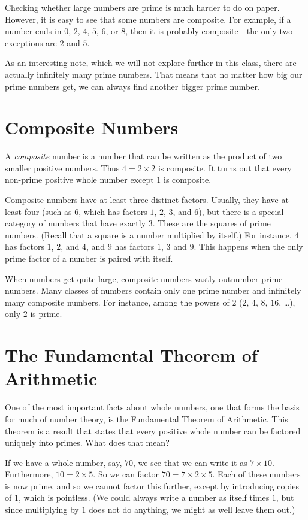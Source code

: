 \documentclass[a4paper,10pt]{report}
\begin{document}
Checking whether large numbers are prime is much harder to do on paper.
However, it is easy to see that some numbers are composite. For example, if a
number ends in \(0\), \(2\), \(4\), \(5\), \(6\), or \(8\), then it is probably
composite---the only two exceptions are \(2\) and \(5\).

As an interesting note, which we will not explore further in this class, there
are actually infinitely many prime numbers. That means that no matter how big
our prime numbers get, we can always find another bigger prime number.

\section{Composite Numbers}

A \emph{composite} number is a number that can be written as the product of two
smaller positive numbers. Thus \(4=2\times2\) is composite. It turns out that
every non-prime positive whole number except \(1\) is composite.

Composite numbers have at least three distinct factors. Usually, they have at
least four (such as \(6\), which has factors \(1\), \(2\), \(3\), and \(6\)),
but there is a special category of numbers that have exactly \(3\). These are
the squares of prime numbers. (Recall that a square is a number multiplied by
itself.) For instance, \(4\) has factors \(1\), \(2\), and \(4\), and \(9\) has
factors \(1\), \(3\) and \(9\). This happens when the only prime factor of a
number is paired with itself.

When numbers get quite large, composite numbers vastly outnumber prime numbers.
Many classes of numbers contain only one prime number and infinitely many
composite numbers. For instance, among the powers of \(2\) (\(2\), \(4\),
\(8\), \(16\), \dots), only \(2\) is prime.

\section{The Fundamental Theorem of Arithmetic}

One of the most important facts about whole numbers, one that forms the basis
for much of number theory, is the Fundamental Theorem of Arithmetic. This
theorem is a result that states that every positive whole number can be
factored uniquely into primes. What does that mean?

If we have a whole number, say, \(70\), we see that we can write it as
\(7\times10\). Furthermore, \(10=2\times5\). So we can factor
\(70=7\times2\times5\). Each of these numbers is now prime, and so we cannot
factor this further, except by introducing copies of \(1\), which is pointless.
(We could always write a number as itself times \(1\), but since multiplying by
\(1\) does not do anything, we might as well leave them out.)
\end{document}
